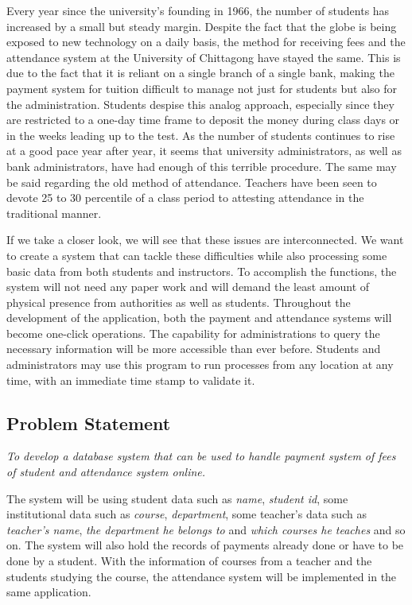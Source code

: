 Every year since the university's founding in 1966, the number of students has increased by a small but steady margin. Despite the fact that the globe is being exposed to new technology on a daily basis, the method for receiving fees and the attendance system at the University of Chittagong have stayed the same. This is due to the fact that it is reliant on a single branch of a single bank, making the payment system for tuition difficult to manage not just for students but also for the administration. Students despise this analog approach, especially since they are restricted to a one-day time frame to deposit the money during class days or in the weeks leading up to the test. As the number of students continues to rise at a good pace year after year, it seems that university administrators, as well as bank administrators, have had enough of this terrible procedure. The same may be said regarding the old method of attendance. Teachers have been seen to devote 25 to 30 percentile of a class period to attesting attendance in the traditional manner.

If we take a closer look, we will see that these issues are interconnected. We want to create a system that can tackle these difficulties while also processing some basic data from both students and instructors. To accomplish the functions, the system will not need any paper work and will demand the least amount of physical presence from authorities as well as students. Throughout the development of the application, both the payment and attendance systems will become one-click operations. The capability for administrations to query the necessary information will be more accessible than ever before. Students and administrators may use this program to run processes from any location at any time, with an immediate time stamp to validate it.

\subsection{Problem Statement}\label{subsec:ps} 

\emph{To develop a database system that can be used to handle payment system of fees of student and attendance system online.}

The system will be using student data such as \emph{name}, \emph{student id}, some institutional data such as \emph{course}, \emph{department}, some teacher's data such as \emph{teacher's name}, \emph{the department he belongs to} and \emph{which courses he teaches} and so on. The system will also hold the records of payments already done or have to be done by a student. With the information of courses from a teacher and the students studying the course, the attendance system will be implemented in the same application.


